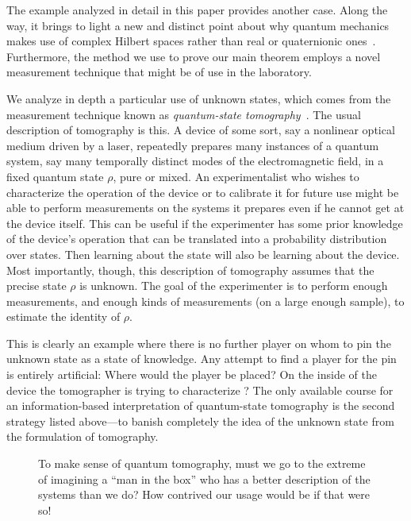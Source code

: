 \documentclass[12pt,aps,eqsecnum]{revtex4-1}
\begin{document}
The example analyzed in detail in this paper provides another case.
Along the way, it brings to light a new and distinct point about why
quantum mechanics makes use of complex Hilbert spaces rather than
real or quaternionic
ones~\cite{Stueckelberg1960,Adler1995,Araki1980,Wootters1990}.
Furthermore, the method we use to prove our main theorem employs a
novel measurement technique that might be of use in the laboratory.

We analyze in depth a particular use of unknown states, which
comes from the measurement technique known as {\it quantum-state
tomography\/}~\cite{Vogel1989b,Smithey1993,Leonhardt1995}. The
usual description of tomography is this.  A device of some sort,
say a nonlinear optical medium driven by a laser, repeatedly
prepares many instances of a quantum system, say many temporally
distinct modes of the electromagnetic field, in a fixed quantum
state $\rho$, pure or mixed.  An experimentalist who wishes to
characterize the operation of the device or to calibrate it for
future use might be able to perform measurements on the systems it
prepares even if he cannot get at the device itself.  This can be
useful if the experimenter has some prior knowledge of the
device's operation that can be translated into a probability
distribution over states. Then learning about the state will also
be learning about the device.  Most importantly, though, this
description of tomography assumes that the precise state $\rho$ is
unknown.  The goal of the experimenter is to perform enough
measurements, and enough kinds of measurements (on a large enough
sample), to estimate the identity of $\rho$.

This is clearly an example where there is no further player on
whom to pin the unknown state as a state of knowledge.  Any
attempt to find a player for the pin is entirely artificial: Where
would the player be placed?  On the inside of the device the
tomographer is trying to characterize \cite{BerkeleyRhyme}?  The
only available course for an information-based interpretation of
quantum-state tomography is the second strategy listed above---to
banish completely the idea of the unknown state from the formulation
of tomography.

\begin{figure} \leavevmode
\epsfxsize=9cm  \bigskip\caption{To make sense of
quantum tomography, must we go to the extreme of imagining a ``man
in the box'' who has a better description of the systems than we
do?  How contrived our usage would be if that were so!}
\end{figure}
\end{document}
